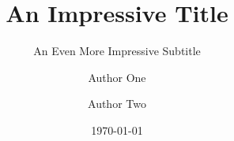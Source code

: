 \title{An Impressive Title}
\subtitle{An Even More Impressive Subtitle}




\author[1]{Author One}
\author[2]{Author Two}



\date{\today}

\onecolumn
\maketitle

\begin{abstract}
    \lipsum[1]
\end{abstract}

\twocolumn
